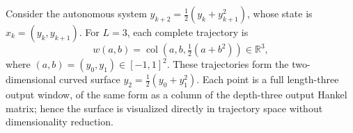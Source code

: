 \begin{example}
Consider the autonomous system
\(y_{k+2}=\tfrac12(y_k+y_{k+1}^2)\), whose state is
\(x_k=(y_k,y_{k+1})\).
For \(L=3\), each complete trajectory is
\[
    w(a,b)=\operatorname{col}\!\left(a,b,\tfrac12(a+b^2)\right)
    \in\mathbb{R}^3,
\]
where \((a,b)=(y_0,y_1)\in[-1,1]^2\).
These trajectories form the two-dimensional curved surface
\(y_2=\tfrac12(y_0+y_1^2)\).
Each point is a full length-three output window, of the same form as a
column of the depth-three output Hankel matrix; hence the surface is
visualized directly in trajectory space without dimensionality reduction.
\end{example}
